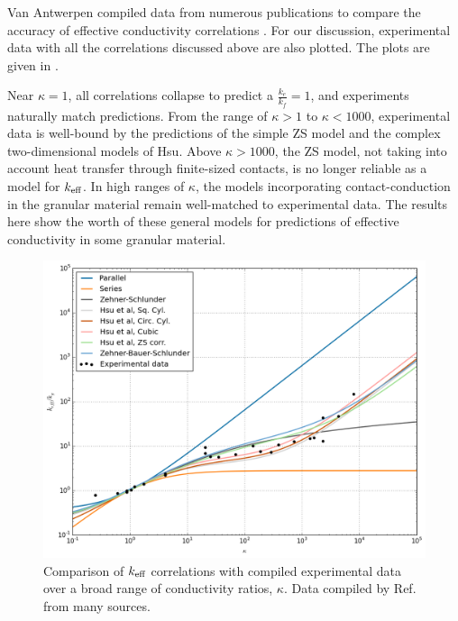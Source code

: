 Van Antwerpen compiled data from numerous publications to compare the accuracy of effective conductivity correlations \cite{VanAntwerpen2010}. For our discussion, experimental data with all the correlations discussed above are also plotted. The plots are given in .

Near $\kappa = 1$, all correlations collapse to predict a $\frac{k_e}{k_f} = 1$, and experiments naturally match predictions. From the range of $\kappa > 1$ to $\kappa <1000$, experimental data is well-bound by the predictions of the simple ZS model and the complex two-dimensional models of Hsu\etal. Above $\kappa > 1000$, the ZS model, not taking into account heat transfer through finite-sized contacts, is no longer reliable as a model for $k_\text{eff}$. In high ranges of $\kappa$, the models incorporating contact-conduction in the granular material remain well-matched to experimental data. The results here show the worth of these general models for predictions of effective conductivity in some granular material.

\begin{figure}[ht]
    \centering
    \includegraphics[width=\textwidth]{figures/keff-kappa-experimental}
    \caption{Comparison of $k_\text{eff}$ correlations with compiled experimental data over a broad range of conductivity ratios, $\kappa$. Data compiled by Ref.\cite{VanAntwerpen2010} from many sources.}
    \label{fig:kappa-experimental}
\end{figure}

